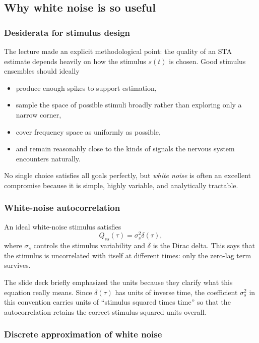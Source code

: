 \documentclass[11pt]{article}
\begin{document}
\subsection{Why white noise is so useful}

\subsubsection{Desiderata for stimulus design}

The lecture made an explicit methodological point: the quality of an STA estimate depends heavily on how the stimulus $s(t)$ is chosen. Good stimulus ensembles should ideally
\begin{itemize}
    \item produce enough spikes to support estimation,
    \item sample the space of possible stimuli broadly rather than exploring only a narrow corner,
    \item cover frequency space as uniformly as possible,
    \item and remain reasonably close to the kinds of signals the nervous system encounters naturally.
\end{itemize}

No single choice satisfies all goals perfectly, but \emph{white noise} is often an excellent compromise because it is simple, highly variable, and analytically tractable.

\subsubsection{White-noise autocorrelation}

An ideal white-noise stimulus satisfies
\[
Q_{ss}(\tau) = \sigma_s^2 \delta(\tau),
\]
where $\sigma_s$ controls the stimulus variability and $\delta$ is the Dirac delta. This says that the stimulus is uncorrelated with itself at different times: only the zero-lag term survives.

The slide deck briefly emphasized the units because they clarify what this equation really means. Since $\delta(\tau)$ has units of inverse time, the coefficient $\sigma_s^2$ in this convention carries units of ``stimulus squared times time'' so that the autocorrelation retains the correct stimulus-squared units overall.

\subsubsection{Discrete approximation of white noise}
\end{document}
